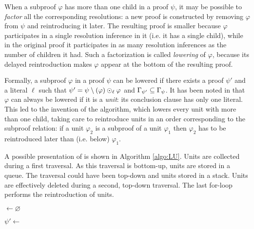 \documentclass{llncs}
\begin{document}
When a subproof $\varphi$ has more than one child in a proof $\psi$, it may be possible to \emph{factor} all
the corresponding resolutions: a new proof is
constructed by removing $\varphi$ from $\psi$ and reintroducing it later. The resulting proof is smaller because $\varphi$ participates in a single resolution inference in it (i.e. it has a single child), while in the original proof it participates in as many resolution inferences as the number of children it had. Such a factorization is called \emph{lowering} of $\varphi$, because its delayed reintroduction makes $\varphi$ appear at the bottom of the resulting proof. 

Formally, a subproof $\varphi$ in a proof $\psi$ can be lowered if there exists a proof
$\psi'$ and a literal $\ell$ such that $\psi' = \psi \setminus (\varphi) \odot_{\ell} \varphi$ and
$\Gamma_{\psi'} \subseteq \Gamma_{\psi}$. It has been noted in \cite{LURPI} that $\varphi$ can always be lowered if it is a \emph{unit}: its conclusion clause has only one literal. This led to the invention of the {\LowerUnits} algorithm, which lowers every unit with more than one child, taking care to reintroduce units in
an order corresponding to the subproof relation: if a unit $\varphi_2$ is a subproof of a unit
$\varphi_1$ then $\varphi_2$ has to be reintroduced later than (i.e. below) $\varphi_1$.

A possible presentation of {\LowerUnits} is shown in Algorithm \ref{algo:LU}. Units are collected
during a first traversal. As this traversal is bottom-up, units are stored in a queue. The traversal
could have been top-down and units stored in a stack. Units are effectively deleted during a second,
top-down traversal. The last for-loop performs the reintroduction of units.

\begin{algorithm}[bt]
  \BlankLine

  \Units $\leftarrow \varnothing$ \;
  \BlankLine

  \BlankLine

  $\psi' \leftarrow $ \Rec{$\psi$,$\Units$} \;
  \BlankLine


  \caption{\LowerUnits}
  \label{algo:LU}
\end{algorithm}
\end{document}
